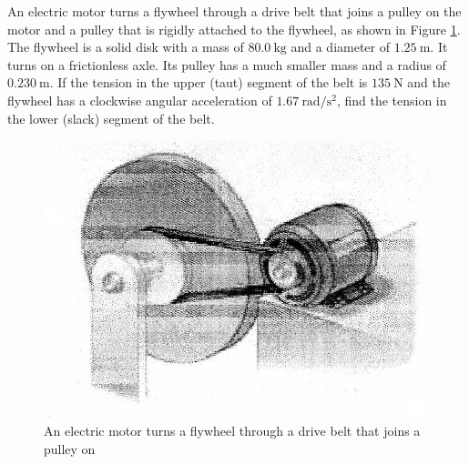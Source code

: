 \begin{problem}
    An electric motor turns a flywheel through a drive belt that joins a pulley on the motor and a pulley that is rigidly attached to the flywheel, as shown in Figure \ref{2010q7}. The flywheel is a solid disk with a mass of $\qty{80.0}{\kg}$ and a diameter of $\qty{1.25}{\m}$. It turns on a frictionless axle. Its pulley has a much smaller mass and a radius of $\qty{0.230}{\m}$. If the tension in the upper (taut) segment of the belt is $\qty{135}{\N}$ and the flywheel has a clockwise angular acceleration of $\qty{1.67}{\radian\per\s\squared}$, find the tension in the lower (slack) segment of the belt.
    \begin{figure}[h]
	    \centering
	    \includegraphics[width=0.5\linewidth]{spho_book_TYS_images/2010q7.png}
	    \caption{An electric motor turns a flywheel through a drive belt that joins a pulley on}\label{2010q7}
    \end{figure}
\end{problem}

